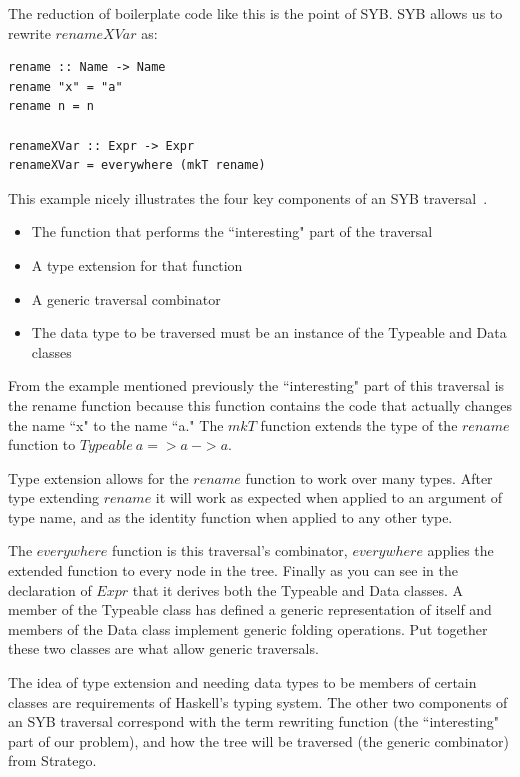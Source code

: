	The reduction of boilerplate code like this is the point of SYB. SYB allows us to rewrite $renameXVar$ as:
	
	\begin{verbatim}
rename :: Name -> Name
rename "x" = "a"
rename n = n

renameXVar :: Expr -> Expr
renameXVar = everywhere (mkT rename)
	\end{verbatim} 
	
	This example nicely illustrates the four key components of an SYB traversal~\citep{syb}.

	\begin{itemize}
		\item The function that performs the ``interesting" part of the traversal
		\item A type extension for that function
		\item A generic traversal combinator
		\item The data type to be traversed must be an instance of the Typeable and Data classes
	\end{itemize}
	
	From the example mentioned previously the ``interesting" part of this traversal is the rename function because this function contains the code that actually changes the name ``x" to the name ``a." The $mkT$ function extends the type of the $rename$ function to $Typeable~a = > a~ -> a$. 
	
	Type extension allows for the $rename$ function to work over many types. After type extending $rename$ it will work as expected when applied to an argument of type name, and as the identity function when applied to any other type.
	
	The $everywhere$ function is this traversal's combinator, $everywhere$ applies the extended function to every node in the tree. Finally as you can see in the declaration of $Expr$ that it derives both the Typeable and Data classes. A member of the Typeable class has defined a generic representation of itself and members of the Data class implement generic folding operations. Put together these two classes are what allow generic traversals. 
	
The idea of type extension and needing data types to be members of certain classes are requirements of Haskell's typing system. The other two components of an SYB traversal correspond with the term rewriting function (the ``interesting" part of our problem), and how the tree will be traversed (the generic combinator) from Stratego.
	  
